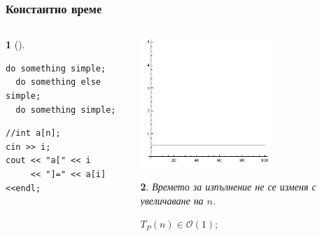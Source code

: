 \documentclass{beamer}
\newtheorem*{remark}{}
\begin{document}
\begin{frame}[fragile]
\frametitle{Константно време}


\begin{columns}[t]
  \begin{column}{0.6\textwidth}
\begin{remark}[]
  \begin{lstlisting}[mathescape]
  do something simple;
  do something else simple;
  do something simple;
  \end{lstlisting}
\end{remark}

\begin{flushleft}
\begin{lstlisting}
//int a[n];
cin >> i;
cout << "a[" << i 
     << "]=" << a[i] <<endl;
\end{lstlisting}
\end{flushleft}


  \end{column}
  \begin{column}{0.4\textwidth}

   \includegraphics[width=5cm]{images/constantf}
    \begin{flushleft}
    \begin{remark}
      Времето за изпълнение не се изменя с увеличаване на $n$.

      $T_P(n) \in \mathcal{O}(1);$
    \end{remark}
      
    \end{flushleft}


  \end{column}
\end{columns}




\end{frame}
\end{document}
